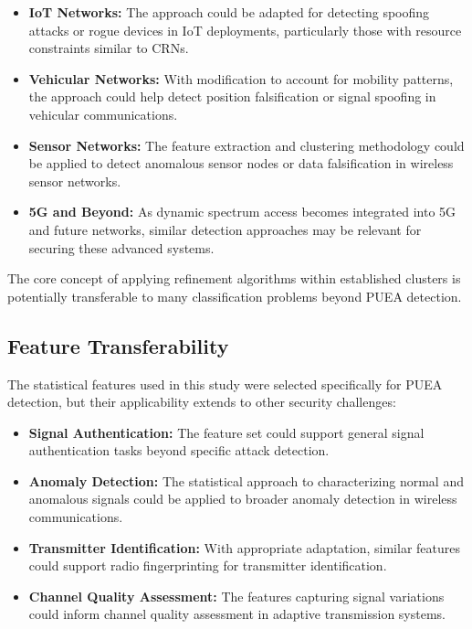 \begin{itemize}
    \item \textbf{IoT Networks:} The approach could be adapted for detecting spoofing attacks or rogue devices in IoT deployments, particularly those with resource constraints similar to CRNs.
    
    \item \textbf{Vehicular Networks:} With modification to account for mobility patterns, the approach could help detect position falsification or signal spoofing in vehicular communications.
    
    \item \textbf{Sensor Networks:} The feature extraction and clustering methodology could be applied to detect anomalous sensor nodes or data falsification in wireless sensor networks.
    
    \item \textbf{5G and Beyond:} As dynamic spectrum access becomes integrated into 5G and future networks, similar detection approaches may be relevant for securing these advanced systems.
\end{itemize}

The core concept of applying refinement algorithms within established clusters is potentially transferable to many classification problems beyond PUEA detection.

\subsection{Feature Transferability}

The statistical features used in this study were selected specifically for PUEA detection, but their applicability extends to other security challenges:

\begin{itemize}
    \item \textbf{Signal Authentication:} The feature set could support general signal authentication tasks beyond specific attack detection.
    
    \item \textbf{Anomaly Detection:} The statistical approach to characterizing normal and anomalous signals could be applied to broader anomaly detection in wireless communications.
    
    \item \textbf{Transmitter Identification:} With appropriate adaptation, similar features could support radio fingerprinting for transmitter identification.
    
    \item \textbf{Channel Quality Assessment:} The features capturing signal variations could inform channel quality assessment in adaptive transmission systems.
\end{itemize}


